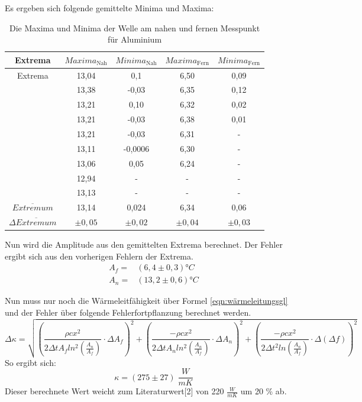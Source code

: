 \documentclass[titlepage = firstcover]{scrartcl}
\begin{document}
    Es ergeben sich folgende gemittelte Minima und Maxima:

    \begin{table}[h]
      \centering
      \caption{Die Maxima und Minima der Welle am nahen und fernen Messpunkt für Aluminium}
      \label{tab:AmplitudeAlu}
      \begin{tabular}{c c c c c}
        \toprule
        {Extrema} & $Maxima_{\text{Nah}}$ & $Minima_{\text{Nah}}$ & $Maxima_{\text{Fern}}$ & $Minima_{\text{Fern}}$ \\
        \midrule
        Extrema       & 13,04&0,1      &6,50 & 0,09 \\
                & 13,38&-0,03     &6,35 & 0,12 \\
                & 13,21& 0,10     &6,32 & 0,02 \\
                & 13,21& -0,03    &6,38 & 0,01 \\
                & 13,21& -0,03    &6,31 &- \\
                & 13,11& -0,0006  &6,30 &- \\
                & 13,06& 0,05     &6,24 &- \\
                & 12,94& -        &-    &- \\
                & 13,13& -        &-    &- \\
  $\overline{Extremum}$ & 13,14 & 0,024  &   6,34  & 0,06 \\
  $\Delta \overline{Extremum}$ & $\pm 0,05 $ & $\pm 0,02$  & $\pm 0,04$  & $\pm 0,03$ \\

        \bottomrule
      \end{tabular}   
    \end{table}
    Nun wird die Amplitude aus den gemittelten Extrema berechnet. Der Fehler ergibt sich aus den vorherigen Fehlern der Extrema.
    \begin{align*}
      A_f =& (6,4 \pm 0,3) °C\\
      A_n =& (13,2 \pm 0,6) °C
    \end{align*}

    Nun muss nur noch die Wärmeleitfähigkeit über Formel \eqref{eqn:wärmeleitungsgl} und der Fehler über folgende Fehlerfortpflanzung berechnet werden.
    \begin{equation*}
      \Delta \kappa = \sqrt{(\frac{\rho c x^2}{2 \Delta t A_f ln^2(\frac{A_n}{A_f})}\cdot \Delta A_f)^2 + (\frac{-\rho c x^2}{2 \Delta t A_n ln^2(\frac{A_n}{A_f})}\cdot \Delta A_n)^2 + (\frac{-\rho c x^2}{2 \Delta t^2 ln(\frac{A_n}{A_f})}\cdot \Delta(\Delta f))^2}
    \end{equation*}
    So ergibt sich:
    \begin{equation*}
      \kappa = (275 \pm 27) \; \frac{W}{mK}
    \end{equation*}
    Dieser berechnete Wert weicht zum Literaturwert[2] von 220 $\frac{W}{mK}$ um 20 \% ab.
\end{document}
